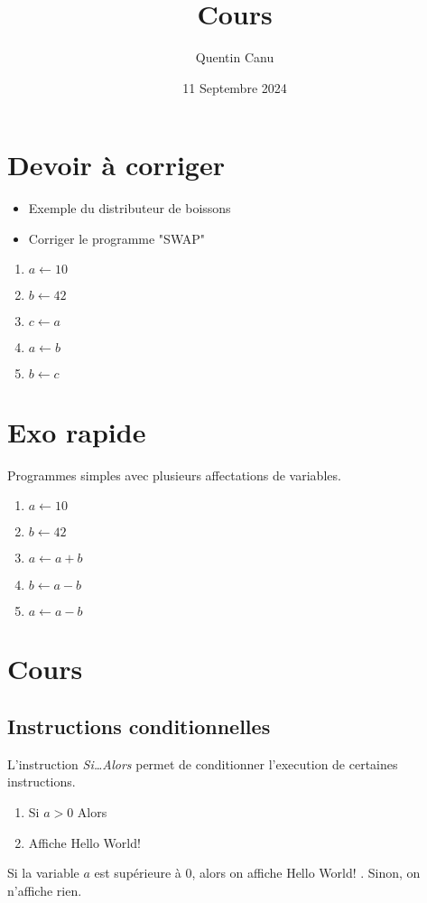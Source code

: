 \documentclass{article}
\title{Cours}
\date{11 Septembre 2024}
\author{Quentin Canu}
\begin{document}
\maketitle

\section{Devoir à corriger}
\begin{itemize}
\item Exemple du distributeur de boissons  
\item Corriger le programme "SWAP"
\end{itemize}
\begin{enumerate}
\item $a \leftarrow 10$
\item $b \leftarrow 42$
\item $c \leftarrow a$
\item $a \leftarrow b$
\item $b \leftarrow c$ 
\end{enumerate}

\section{Exo rapide}
Programmes simples avec plusieurs affectations de variables.

\begin{enumerate}
\item $a \leftarrow 10$
\item $b \leftarrow 42$
\item $a \leftarrow a + b$
\item $b \leftarrow a - b$
\item $a \leftarrow a - b$ 
\end{enumerate}

\section{Cours}
\subsection{Instructions conditionnelles}
L'instruction \emph{Si\dots Alors} permet de conditionner l'execution de certaines instructions.

\begin{enumerate}
\item Si $a > 0$ Alors
\item Affiche \og Hello World! \fg
\end{enumerate}
Si la variable $a$ est supérieure à $0$, alors on affiche \og Hello World! \fg. Sinon, on n'affiche rien. 
\end{document}
